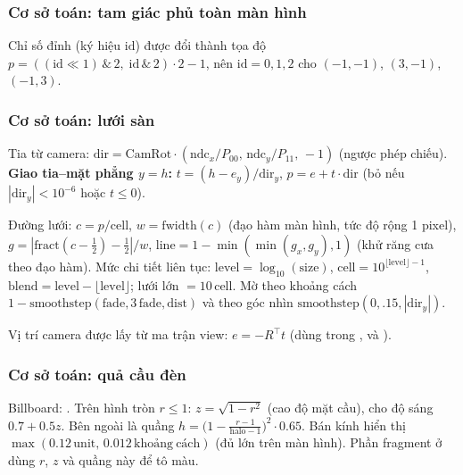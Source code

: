 \subsubsection{Cơ sở toán: tam giác phủ toàn màn hình}\label{s:math-grid-vert}
Chỉ số đỉnh  (ký hiệu $\mathrm{id}$) được đổi thành tọa độ $p=((\mathrm{id}\ll1)\,\&\,2,\;\mathrm{id}\,\&\,2)\cdot2-1$, nên $\mathrm{id}=0,1,2$ cho $(-1,-1)$, $(3,-1)$, $(-1,3)$.
\subsubsection{Cơ sở toán: lưới sàn}\label{s:math-grid-frag}
Tia từ camera: $\mathrm{dir}=\mathrm{CamRot}\cdot(\mathrm{ndc}_x/P_{00},\,\mathrm{ndc}_y/P_{11},\,-1)$ (ngược phép chiếu). \textbf{Giao tia--mặt phẳng $y=h$:} $t=(h-e_y)/\mathrm{dir}_y$, $p=e+t\cdot\mathrm{dir}$ (bỏ nếu $|\mathrm{dir}_y|<10^{-6}$ hoặc $t\le0$).

Đường lưới: $c=p/\mathrm{cell}$, $w=\mathrm{fwidth}(c)$ (đạo hàm màn hình, tức độ rộng 1 pixel), $g=|\mathrm{fract}(c-\tfrac12)-\tfrac12|/w$, $\mathrm{line}=1-\min(\min(g_x,g_y),1)$ (khử răng cưa theo đạo hàm). Mức chi tiết liên tục: $\mathrm{level}=\log_{10}(\mathrm{size})$, $\mathrm{cell}=10^{\lfloor\mathrm{level}\rfloor-1}$, $\mathrm{blend}=\mathrm{level}-\lfloor\mathrm{level}\rfloor$; lưới lớn $=10\,\mathrm{cell}$. Mờ theo khoảng cách $1-\mathrm{smoothstep}(\mathrm{fade},3\,\mathrm{fade},\mathrm{dist})$ và theo góc nhìn $\mathrm{smoothstep}(0,.15,|\mathrm{dir}_y|)$.

Vị trí camera được lấy từ ma trận view: $e=-R^{\top}t$ (dùng trong ,  và ).
\subsubsection{Cơ sở toán: quả cầu đèn}\label{s:math-light-gizmo}
Billboard: . Trên hình tròn $r\le1$: $z=\sqrt{1-r^2}$ (cao độ mặt cầu), cho độ sáng $0.7+0.5z$. Bên ngoài là quầng $h=\big(1-\frac{r-1}{\mathrm{halo}-1}\big)^2\cdot0.65$. Bán kính hiển thị $\max(0.12\,\mathrm{unit},\,0.012\,\mathrm{khoảng\ cách})$ (đủ lớn trên màn hình). Phần fragment ở  dùng $r$, $z$ và quầng này để tô màu.
